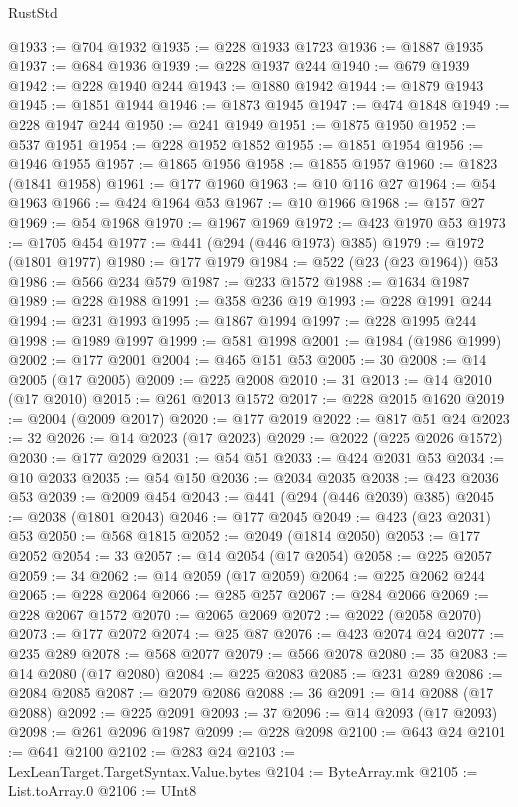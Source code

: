 \begin{lexlean}{RustStd}
\begin{coremodule}
@1933 := @704 @1932
@1935 := @228 @1933 @1723
@1936 := @1887 @1935
@1937 := @684 @1936
@1939 := @228 @1937 @244
@1940 := @679 @1939
@1942 := @228 @1940 @244
@1943 := @1880 @1942
@1944 := @1879 @1943
@1945 := @1851 @1944
@1946 := @1873 @1945
@1947 := @474 @1848
@1949 := @228 @1947 @244
@1950 := @241 @1949
@1951 := @1875 @1950
@1952 := @537 @1951
@1954 := @228 @1952 @1852
@1955 := @1851 @1954
@1956 := @1946 @1955
@1957 := @1865 @1956
@1958 := @1855 @1957
@1960 := @1823 (@1841 @1958)
@1961 := @177 @1960
@1963 := @10 @116 @27
@1964 := @54 @1963
@1966 := @424 @1964 @53
@1967 := @10 @1966
@1968 := @157 @27
@1969 := @54 @1968
@1970 := @1967 @1969
@1972 := @423 @1970 @53
@1973 := @1705 @454
@1977 := @441 (@294 (@446 @1973) @385)
@1979 := @1972 (@1801 @1977)
@1980 := @177 @1979
@1984 := @522 (@23 (@23 @1964)) @53
@1986 := @566 @234 @579
@1987 := @233 @1572
@1988 := @1634 @1987
@1989 := @228 @1988
@1991 := @358 @236 @19
@1993 := @228 @1991 @244
@1994 := @231 @1993
@1995 := @1867 @1994
@1997 := @228 @1995 @244
@1998 := @1989 @1997
@1999 := @581 @1998
@2001 := @1984 (@1986 @1999)
@2002 := @177 @2001
@2004 := @465 @151 @53
@2005 := 30
@2008 := @14 @2005 (@17 @2005)
@2009 := @225 @2008
@2010 := 31
@2013 := @14 @2010 (@17 @2010)
@2015 := @261 @2013 @1572
@2017 := @228 @2015 @1620
@2019 := @2004 (@2009 @2017)
@2020 := @177 @2019
@2022 := @817 @51 @24
@2023 := 32
@2026 := @14 @2023 (@17 @2023)
@2029 := @2022 (@225 @2026 @1572)
@2030 := @177 @2029
@2031 := @54 @51
@2033 := @424 @2031 @53
@2034 := @10 @2033
@2035 := @54 @150
@2036 := @2034 @2035
@2038 := @423 @2036 @53
@2039 := @2009 @454
@2043 := @441 (@294 (@446 @2039) @385)
@2045 := @2038 (@1801 @2043)
@2046 := @177 @2045
@2049 := @423 (@23 @2031) @53
@2050 := @568 @1815
@2052 := @2049 (@1814 @2050)
@2053 := @177 @2052
@2054 := 33
@2057 := @14 @2054 (@17 @2054)
@2058 := @225 @2057
@2059 := 34
@2062 := @14 @2059 (@17 @2059)
@2064 := @225 @2062 @244
@2065 := @228 @2064
@2066 := @285 @257
@2067 := @284 @2066
@2069 := @228 @2067 @1572
@2070 := @2065 @2069
@2072 := @2022 (@2058 @2070)
@2073 := @177 @2072
@2074 := @25 @87
@2076 := @423 @2074 @24
@2077 := @235 @289
@2078 := @568 @2077
@2079 := @566 @2078
@2080 := 35
@2083 := @14 @2080 (@17 @2080)
@2084 := @225 @2083
@2085 := @231 @289
@2086 := @2084 @2085
@2087 := @2079 @2086
@2088 := 36
@2091 := @14 @2088 (@17 @2088)
@2092 := @225 @2091
@2093 := 37
@2096 := @14 @2093 (@17 @2093)
@2098 := @261 @2096 @1987
@2099 := @228 @2098
@2100 := @643 @24
@2101 := @641 @2100
@2102 := @283 @24
@2103 := LexLeanTarget.TargetSyntax.Value.bytes
@2104 := ByteArray.mk
@2105 := List.toArray.{0}
@2106 := UInt8

\end{coremodule}
\end{lexlean}
